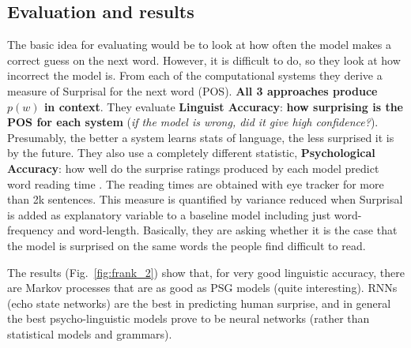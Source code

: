 \subsection{Evaluation and results}
The basic idea for evaluating would be to look at how often the model makes a correct guess on the next word. However, it is difficult to do, so they look at how incorrect the model is. 
From each of the computational systems they derive a measure of Surprisal for the next word (POS). \textbf{All 3 approaches produce $p(w)$ in context}. 
They evaluate \textbf{Linguist Accuracy}: \textbf{how surprising is the POS for each system} (\textit{if the model is wrong, did it give high confidence?}). Presumably, the better a system learns stats of language, the less surprised it is by the future.
They also use a completely different statistic, \textbf{Psychological Accuracy}: how well do the surprise ratings produced by each model predict word reading time \notet.
The reading times are obtained with eye tracker for more than 2k sentences. This measure is quantified by variance reduced when Surprisal is added as explanatory variable to a baseline model including just word-frequency and word-length. Basically, they are asking whether it is the case that the model is surprised on the same words the people find difficult to read.


The results (Fig.~\ref{fig:frank_2}) show that, for very good linguistic accuracy, there are Markov processes that are as good as PSG models (quite interesting).
RNNs (echo state networks) are the best in predicting human surprise, and in general the best psycho-linguistic models prove to be neural networks (rather than statistical models and grammars).

